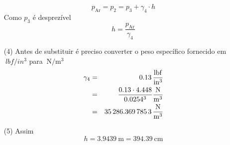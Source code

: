 \documentclass[
	a4paper,
	12pt,
	brazilian
]{article}
\begin{document}
\begin{enumerate}
\begin{center}
		\end{center}
		\begin{equation}
			p_{\textrm{Ar}}=p_{2}=p_{3}+\gamma_{4}\cdot h
		\end{equation}
		Como $p_{3}$ é desprezível
		\begin{equation}
			h=\dfrac{p_{\textrm{Ar}}}{\gamma_{4}}
		\end{equation}
		\item[(4)] Antes de substituir é preciso converter o peso específico fornecido em $\SI{}{lbf/in^{3}}$ para $\SI{}{\newton/\meter^{3}}$
		\begin{eqnarray}
			\gamma_{4}&=&\SI{0.13}{\dfrac{lbf}{in^{3}}}\\
			&=&\dfrac{0.13\cdot 4.448}{0.0254^{3}}\SI{}{\dfrac{\newton}{\meter^{3}}}\\
			&=&\SI{35286.3697853}{\dfrac{\newton}{\meter^{3}}}
		\end{eqnarray}
		\item[(5)] Assim
		\begin{equation}
			h=\SI{3.9439}{\meter}=\SI{394.39}{\centi\meter}
		\end{equation}
	\end{enumerate}
\end{document}
